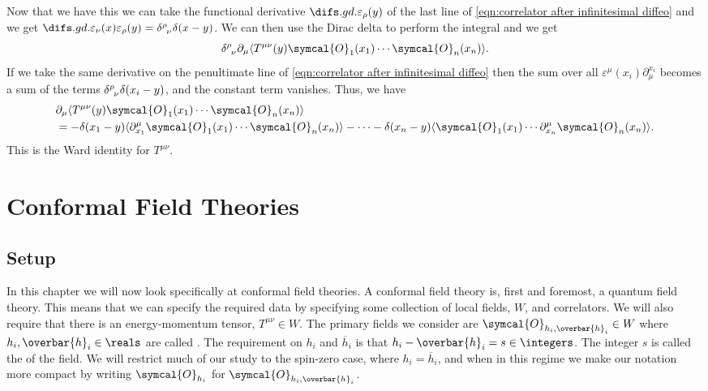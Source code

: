 \documentclass[fleqn]{NotesClass}
\newcommand{\quantumField}[1]{\symcal{#1}}
\DeclarePairedDelimiter{\correlator}{\langle}{\rangle}
\begin{document}
    Now that we have this we can take the functional derivative \(\difsd{}{\varepsilon_\rho(y)}\) of the last line of \cref{eqn:correlator after infinitesimal diffeo} and we get \(\difsd{\varepsilon_\nu(x)}{\varepsilon_\rho(y)} = \tensor{\delta}{^\rho_\nu}\delta(x - y)\).
    We can then use the Dirac delta to perform the integral and we get
    \begin{equation}
        \tensor{\delta}{^\rho_\nu} \partial_\mu \correlator{T^{\mu\nu}(y) \quantumField{O}_1(x_1) \dotsm \quantumField{O}_n(x_n)}.
    \end{equation}
    If we take the same derivative on the penultimate line of \cref{eqn:correlator after infinitesimal diffeo} then the sum over all \(\varepsilon^\mu(x_i)\partial_\mu^{x_i}\) becomes a sum of the terms \(\tensor{\delta}{^\rho_\nu} \delta(x_i - y)\), and the constant term vanishes.
    Thus, we have
    \begin{align}
        \label{eqn:ward identity for energy momentum tensor}
        &\partial_\mu \correlator{T^{\mu\nu}(y) \quantumField{O}_1(x_1) \dotsm \quantumField{O}_n(x_n)}\\
        &= - \delta(x_1 - y) \correlator{\partial^\mu_{x_1}\quantumField{O}_1(x_1) \dotsm \quantumField{O}_n(x_n)} - \dotsb - \delta(x_n - y) \correlator{\quantumField{O}_1(x_1) \dotsm \partial^\mu_{x_n} \quantumField{O}_n(x_n)}. \notag
    \end{align}
    This is the Ward identity for \(T^{\mu\nu}\).
    
    \chapter{Conformal Field Theories}
    \section{Setup}
    In this chapter we will now look specifically at conformal field theories.
    A conformal field theory is, first and foremost, a quantum field theory.
    This means that we can specify the required data by specifying some collection of local fields, \(W\), and correlators.
    We will also require that there is an energy-momentum tensor, \(T^{\mu\nu} \in W\).
    The primary fields we consider are \(\quantumField{O}_{h_i, \overbar{h}_i} \in W\) where \(h_i, \overbar{h}_i \in \reals\) are called .
    The requirement on \(h_i\) and \(\overbar{h}_i\) is that \(h_i - \overbar{h}_i = s \in \integers\).
    The integer \(s\) is called the  of the field.
    We will restrict much of our study to the spin-zero case, where \(h_i = \overbar{h}_i\), and when in this regime we make our notation more compact by writing \(\quantumField{O}_{h_i}\) for \(\quantumField{O}_{h_i,\overbar{h}_i}\).
    
\end{document}
